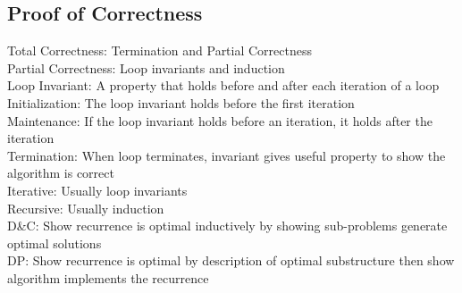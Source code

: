 \documentclass{article}
\author{Ian Chen}
\date{\today}
\begin{document}
    \begin{multicols*}{2}
        \subsection*{Proof of Correctness}
        Total Correctness: Termination and Partial Correctness\\
        Partial Correctness: Loop invariants and induction\\
        Loop Invariant: A property that holds before and after each iteration of a loop\\
        Initialization: The loop invariant holds before the first iteration\\
        Maintenance: If the loop invariant holds before an iteration, it holds after the iteration\\
        Termination: When loop terminates, invariant gives useful property to show the algorithm is
        correct\\
        Iterative: Usually loop invariants\\
        Recursive: Usually induction\\
        D\&C: Show recurrence is optimal inductively by showing sub-problems generate optimal
        solutions\\
        DP: Show recurrence is optimal by description of optimal substructure then show algorithm
        implements the recurrence

\end{multicols*}
\end{document}
